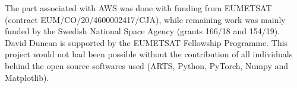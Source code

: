 \documentclass[amt, manuscript]{copernicus}
\begin{document}



\appendixfigures  %

\appendixtables   %








\begin{acknowledgements}
The part associated with AWS was done with funding from EUMETSAT (contract  EUM/CO/20/4600002417/CJA), while remaining work was mainly funded by the Swedish National Space Agency (grants 166/18 and 154/19). David Duncan is supported by the EUMETSAT Fellowship Programme.
This project would not had been possible without the contribution of all individuals behind the open source softwares used (ARTS, Python, PyTorch, Numpy and Matplotlib).
\end{acknowledgements}






 
 
\end{document}
